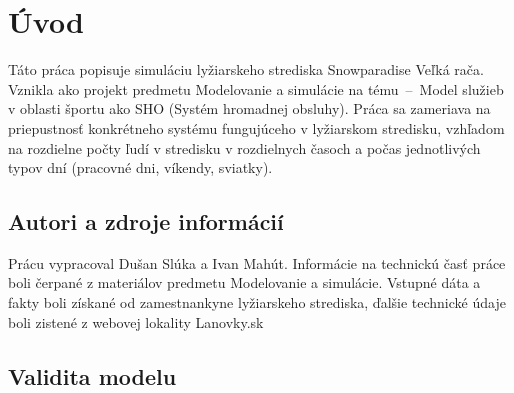 \section{Úvod}
Táto práca popisuje simuláciu lyžiarskeho strediska Snowparadise Veľká rača. Vznikla ako projekt predmetu Modelovanie a simulácie na tému
\,--\, Model služieb v oblasti športu ako SHO (Systém hromadnej obsluhy). Práca sa zameriava na priepustnosť konkrétneho systému fungujúceho v 
lyžiarskom stredisku, vzhľadom na rozdielne počty ľudí v stredisku v rozdielnych časoch a počas jednotlivých typov dní (pracovné dni, víkendy, sviatky).

\subsection{Autori a zdroje informácií}
Prácu vypracoval Dušan Slúka a Ivan Mahút. Informácie na technickú časť práce boli čerpané z materiálov predmetu Modelovanie a simulácie. Vstupné dáta a fakty
boli získané od zamestnankyne lyžiarskeho strediska, ďalšie technické údaje boli zistené z webovej lokality Lanovky.sk\cite{lanovky}

\subsection{Validita modelu}